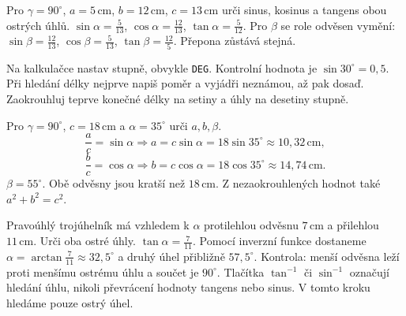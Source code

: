 \documentclass[11pt,a4paper]{article}
\begin{document}
\begin{prikladReseniBox}[title={P1: přesné poměry},breakable=false]
Pro $\gamma=90^\circ$, $a=5\,\mathrm{cm}$, $b=12\,\mathrm{cm}$,
$c=13\,\mathrm{cm}$ urči sinus, kosinus a tangens obou ostrých úhlů.
\tcblower
$\sin\alpha=\frac5{13}$, $\cos\alpha=\frac{12}{13}$,
$\tan\alpha=\frac5{12}$.
Pro $\beta$ se role odvěsen vymění:
$\sin\beta=\frac{12}{13}$, $\cos\beta=\frac5{13}$,
$\tan\beta=\frac{12}5$. Přepona zůstává stejná.
\end{prikladReseniBox}

Na kalkulačce nastav stupně, obvykle \texttt{DEG}.
Kontrolní hodnota je $\sin30^\circ=0{,}5$.
Při hledání délky nejprve napiš poměr a vyjádři neznámou, až pak dosaď.
Zaokrouhluj teprve konečné délky na setiny a úhly na desetiny stupně.

\begin{prikladReseniBox}[title={P2: přepona a ostrý úhel},breakable=false]
Pro $\gamma=90^\circ$, $c=18\,\mathrm{cm}$ a $\alpha=35^\circ$ urči $a,b,\beta$.
\tcblower
\[
\frac ac=\sin\alpha\Rightarrow a=c\sin\alpha
=18\sin35^\circ\approx10{,}32\,\mathrm{cm},
\]
\[
\frac bc=\cos\alpha\Rightarrow b=c\cos\alpha
=18\cos35^\circ\approx14{,}74\,\mathrm{cm}.
\]
$\beta=55^\circ$. Obě odvěsny jsou kratší než $18\,\mathrm{cm}$.
Z nezaokrouhlených hodnot také $a^2+b^2=c^2$.
\end{prikladReseniBox}

\begin{prikladReseniBox}[title={P3: hledáme úhel z poměru},breakable=false]
Pravoúhlý trojúhelník má vzhledem k $\alpha$ protilehlou odvěsnu
$7\,\mathrm{cm}$ a přilehlou $11\,\mathrm{cm}$. Urči oba ostré úhly.
\tcblower
$\tan\alpha=\frac7{11}$. Pomocí inverzní funkce dostaneme
$\alpha=\arctan\frac7{11}\approx32{,}5^\circ$ a druhý úhel přibližně $57{,}5^\circ$.
Kontrola: menší odvěsna leží proti menšímu ostrému úhlu a součet je $90^\circ$.
Tlačítka $\tan^{-1}$ či $\sin^{-1}$ označují hledání úhlu, nikoli převrácení
hodnoty tangens nebo sinus. V tomto kroku hledáme pouze ostrý úhel.
\end{prikladReseniBox}
\end{document}
